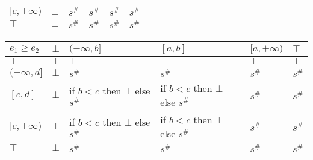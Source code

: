 \documentclass{article}
\begin{document}
\begin{table}[]
\begin{tabular}{|l|l|ll|ll|ll|l|}
    \multirow{3}{*}{$[c, +\infty)$} & \multirow{3}{*}{$\bot$} & \multicolumn{2}{l|}{\multirow{3}{*}{$s^\#$}}                                       & \multicolumn{2}{l|}{\multirow{3}{*}{$s^\#$}}             & \multicolumn{2}{l|}{\multirow{3}{*}{$s^\#$}}                                       & \multirow{3}{*}{$s^\#$} \\
                                    &                         & \multicolumn{2}{l|}{}                                                              & \multicolumn{2}{l|}{}                                    & \multicolumn{2}{l|}{}                                                              &                         \\
                                    &                         & \multicolumn{2}{l|}{}                                                              & \multicolumn{2}{l|}{}                                    & \multicolumn{2}{l|}{}                                                              &                         \\ \hline
    $\top$                          & $\bot$                  & \multicolumn{2}{l|}{$s^\#$}                                                        & \multicolumn{2}{l|}{$s^\#$}                              & \multicolumn{2}{l|}{$s^\#$}                                                        & $s^\#$                  \\ \hline
    \end{tabular}
    \end{table}



    \begin{table}
        \begin{tabular}{|l|l|l|l|l|l|}
        \hline
        $e_1 \ge e_2$  & $\bot$ & $(-\infty, b]$                     & $[a, b]$                           & $[a, +\infty)$ & $\top$ \\ \hline
        $\bot$         & $\bot$ & $\bot$                             & $\bot$                             & $\bot$         & $\bot$ \\ \hline
        $(-\infty, d]$ & $\bot$ & $s^\#$                             & $s^\#$                             & $s^\#$         & $s^\#$ \\ \hline
        $[c, d]$       & $\bot$ & if $b < c$ then $\bot$ else $s^\#$ & if $b < c$ then $\bot$ else $s^\#$ & $s^\#$         & $s^\#$ \\ \hline
        $[c, +\infty)$ & $\bot$ & if $b < c$ then $\bot$ else $s^\#$ & if $b < c$ then $\bot$ else $s^\#$ & $s^\#$         & $s^\#$ \\ \hline
        $\top$         & $\bot$ & $s^\#$                             & $s^\#$                             & $s^\#$         & $s^\#$ \\ \hline
        \end{tabular}
        \end{table}
\end{document}
